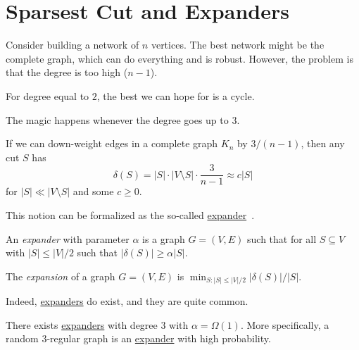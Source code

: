 \section{Sparsest Cut and Expanders}
Consider building a network of \(n\) vertices. The best network might be the complete graph, which can do everything and is robust. However, the problem is that the degree is too high (\(n-1\)).

\begin{eg}
	For degree equal to \(2\), the best we can hope for is a cycle.
\end{eg}

The magic happens whenever the degree goes up to \(3\).

\begin{intuition}
	If we can down-weight edges in a complete graph \(K_n\) by \(3 / (n-1)\), then any cut \(S\) has
	\[
		\delta (S)
		= \lvert S \rvert \cdot \lvert V \setminus S \rvert \cdot \frac{3}{n-1}
		\approx c \lvert S \rvert
	\]
	for \(\lvert S \rvert \ll \lvert V \setminus S \rvert \) and some \(c \geq 0 \).
\end{intuition}

This notion can be formalized as the so-called \hyperref[def:expander]{expander}~\cite{hoory2006expander}.

\begin{definition}[Expander]\label{def:expander}
	An \emph{expander} with parameter \(\alpha \) is a graph \(G = (V, E)\) such that for all \(S \subseteq V\) with \(\lvert S \rvert \leq \lvert V \rvert / 2\) such that \(\lvert \delta (S) \rvert \geq \alpha \lvert S \rvert\).
\end{definition}

\begin{definition}[Expansion]\label{def:expansion}
	The \emph{expansion} of a graph \(G = (V, E)\) is \(\min _{S\colon \lvert S \rvert \leq \lvert V \rvert / 2} \lvert \delta (S) \rvert / \lvert S \rvert \).
\end{definition}

Indeed, \hyperref[def:expander]{expanders} do exist, and they are quite common.

\begin{lemma}\label{lma:expander-existence}
	There exists \hyperref[def:expander]{expanders} with degree \(3\) with \(\alpha = \Omega (1)\). More specifically, a random \(3\)-regular graph is an \hyperref[def:expander]{expander} with high probability.
\end{lemma}

